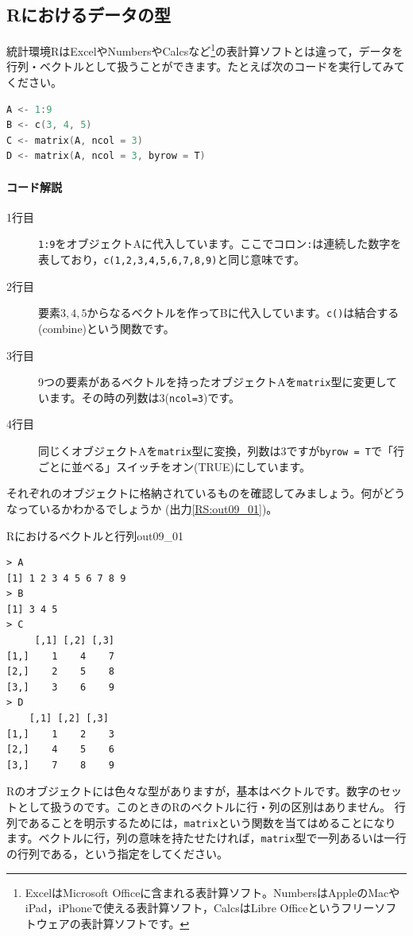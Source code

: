 \documentclass{ltjsbook}
\begin{document}
\subsection{Rにおけるデータの型}
統計環境RはExcelやNumbersやCalcsなど\footnote{ExcelはMicrosoft Officeに含まれる表計算ソフト。NumbersはAppleのMacやiPad，iPhoneで使える表計算ソフト，CalcsはLibre Officeというフリーソフトウェアの表計算ソフトです。}の表計算ソフトとは違って，データを行列・ベクトルとして扱うことができます。たとえば次のコードを実行してみてください。

\begin{lstlisting}[language=c++,label={code:09_01},caption={ベクトルデータの保持}]
A <- 1:9
B <- c(3, 4, 5)
C <- matrix(A, ncol = 3)
D <- matrix(A, ncol = 3, byrow = T)
\end{lstlisting}

\paragraph{コード解説}
\begin{description}
	\item[1行目] \texttt{1:9}をオブジェクトAに代入しています。ここでコロン\verb|:|は連続した数字を表しており，\texttt{c(1,2,3,4,5,6,7,8,9)}と同じ意味です。
	\item[2行目] 要素$3,4,5$からなるベクトルを作ってBに代入しています。\texttt{c()}は結合する(combine)という関数です。
	\item[3行目] 9つの要素があるベクトルを持ったオブジェクトAを\texttt{matrix}型に変更しています。その時の列数は3(\texttt{ncol=3})です。
	\item[4行目] 同じくオブジェクトAを\texttt{matrix}型に変換，列数は3ですが\texttt{byrow = T}で「行ごとに並べる」スイッチをオン(TRUE)にしています。
\end{description}

それぞれのオブジェクトに格納されているものを確認してみましょう。何がどうなっているかわかるでしょうか
(出力\ref{RS:out09_01})。

\begin{Rscreen}{Rにおけるベクトルと行列}{out09_01}
	\begin{verbatim}
> A
[1] 1 2 3 4 5 6 7 8 9
> B
[1] 3 4 5
> C
     [,1] [,2] [,3]
[1,]    1    4    7
[2,]    2    5    8
[3,]    3    6    9
> D
    [,1] [,2] [,3]
[1,]    1    2    3
[2,]    4    5    6
[3,]    7    8    9
    \end{verbatim}
\end{Rscreen}

Rのオブジェクトには色々な型がありますが，基本はベクトルです。数字のセットとして扱うのです。このときのRのベクトルに行・列の区別はありません。
行列であることを明示するためには，\texttt{matrix}という関数を当てはめることになります。ベクトルに行，列の意味を持たせたければ，\texttt{matrix}型で一列あるいは一行の行列である，という指定をしてください。
\end{document}
